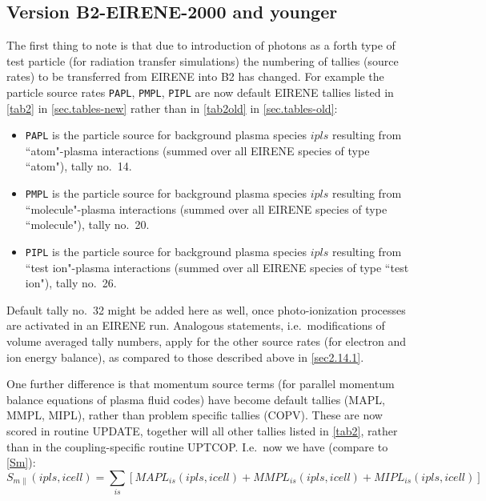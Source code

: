 \subsection{Version B2-EIRENE-2000 and younger} \label{sec2.14.2}

The first thing to note is that due to introduction of photons as a forth type
of test particle (for radiation transfer simulations) the numbering of tallies
(source rates) to be transferred from EIRENE into B2 has changed.
For example the particle source rates \lstinline|PAPL|,
\lstinline|PMPL|, \lstinline|PIPL| are now default EIRENE tallies
listed in \cref{tab2} in \cref{sec.tables-new} rather than in \cref{tab2old} in
\cref{sec.tables-old}:
\begin{itemize}
  \item \lstinline|PAPL| is the particle source for background plasma
        species $ipls$ resulting from ``at\-om"-plasma interactions (summed over all
        EIRENE species of type ``atom"), tally no.\ 14.
  \item \lstinline|PMPL| is the particle source for background plasma
        species $ipls$ resulting from ``mol\-e\-cule"-plasma interactions (summed over
        all EIRENE species of type ``molecule"), tally no.\ 20.
  \item \lstinline|PIPL| is the particle source for background plasma
        species $ipls$ resulting from ``test ion"-plasma interactions (summed over all
        EIRENE species of type ``test ion"), tally no.\ 26.
\end{itemize}
Default tally no.\ 32 might be added here as well, once photo-ionization
processes are activated in an EIRENE run.
Analogous statements, i.e.\ modifications of volume averaged tally numbers,
apply for the other source rates (for electron and ion energy balance), as
compared to those described above in \cref{sec2.14.1}.

One further difference is that momentum source terms (for parallel momentum
balance equations of plasma fluid codes) have become default tallies (MAPL,
MMPL, MIPL), rather than problem specific tallies (COPV).
These are now scored in routine UPDATE, together will all other tallies listed
in \cref{tab2}, rather than in the coupling-specific routine UPTCOP.
I.e.\ now we have (compare to \cref{Sm}):
\begin{equation}
  S_{m\parallel}(ipls,icell) = \sum_{is} \left[MAPL_{is}(ipls,icell) +
    MMPL_{is}(ipls,icell) + MIPL_{is}(ipls,icell) \right]
\end{equation}

